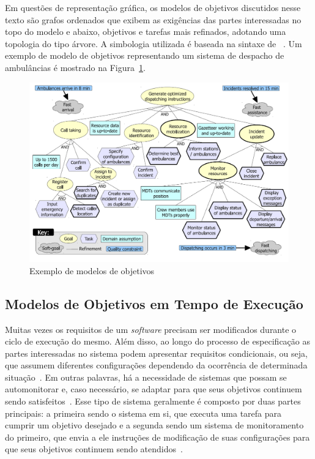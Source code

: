 Em questões de representação gráfica, os modelos de objetivos discutidos nesse texto são grafos ordenados que exibem as exigências das partes interessadas no topo do modelo e abaixo, objetivos e tarefas mais refinados, adotando uma topologia do tipo árvore. A simbologia utilizada é baseada na sintaxe de \istar~\cite{yu20111}. Um exemplo de modelo de objetivos representando um sistema de despacho de ambulâncias é mostrado na Figura~\ref{figura-acad-simples}.

\begin{figure}[h]
	\centering
	\includegraphics[width=1\textwidth]{figuras/modelos/ACAD-Simples.png}
	\caption{Exemplo de modelos de objetivos~\cite{tesevitor}}
	\label{figura-acad-simples}
\end{figure}


\subsection{Modelos de Objetivos em Tempo de Execução}
\label{sec-referencial-engenharia-objetivos-runtime}

Muitas vezes os requisitos de um \textit{software} precisam ser modificados durante o ciclo de execução do mesmo. Além disso, ao longo do processo de especificação as partes interessadas no sistema podem apresentar requisitos condicionais, ou seja, que assumem diferentes configurações dependendo da ocorrência de determinada situação~\cite{souza2012requirement}. Em outras palavras, há a necessidade de sistemas que possam se automonitorar e, caso necessário, se adaptar para que seus objetivos continuem sendo satisfeitos~\cite{dalpiaz2013runtime}. Esse tipo de sistema geralmente é composto por duas partes principais: a primeira sendo o sistema em si, que executa uma tarefa para cumprir um objetivo desejado e a segunda sendo um sistema de monitoramento do primeiro, que envia a ele instruções de modificação de suas configurações para que seus objetivos continuem sendo atendidos~\cite{souza2013awareness}. 

